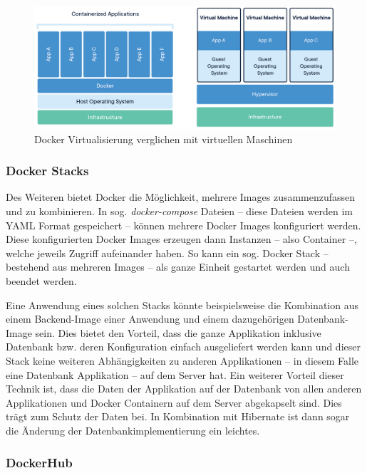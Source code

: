 			\begin{figure}[ht!]
				\centering
				\includegraphics[width=1\textwidth]{images/docker-containerized-and-vm-transparent-bg.png}
				\caption{Docker Virtualisierung verglichen mit virtuellen Maschinen \cite{DockerInc..2020}}
				\label{fig:dockerComparison}
			\end{figure} 
			
			\subsubsection{Docker Stacks}
			
			Des Weiteren bietet Docker die Möglichkeit, mehrere Images zusammenzufassen und zu kombinieren. In sog. \textit{docker-compose} Dateien -- diese Dateien werden im \acs{YAML} Format gespeichert -- können mehrere Docker Images konfiguriert werden. Diese konfigurierten Docker Images erzeugen dann Instanzen -- also Container --, welche jeweils Zugriff aufeinander haben. So kann ein sog. Docker Stack -- bestehend aus mehreren Images -- als ganze Einheit gestartet werden und auch beendet werden. 
			
			Eine Anwendung eines solchen Stacks könnte beispielsweise die Kombination aus einem Backend-Image einer Anwendung und einem dazugehörigen Datenbank-Image sein. Dies bietet den Vorteil, dass die ganze Applikation inklusive Datenbank bzw. deren Konfiguration einfach ausgeliefert werden kann und dieser Stack keine weiteren Abhängigkeiten zu anderen Applikationen -- in diesem Falle eine Datenbank Applikation -- auf dem Server hat. Ein weiterer Vorteil dieser Technik ist, dass die Daten der Applikation auf der Datenbank von allen anderen Applikationen und Docker Containern auf dem Server abgekapselt sind. Dies trägt zum Schutz der Daten bei. In Kombination mit Hibernate ist dann sogar die Änderung der Datenbankimplementierung ein leichtes. 
						
			\subsubsection{DockerHub} %
				
